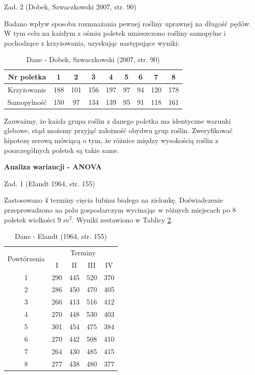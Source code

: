 \documentclass[12pt,B5paper,]{book}
\begin{document}
Zad. 2 (Dobek, Szwaczkowski 2007, str. 90)

Badano wpływ sposobu rozmnażania pewnej rośliny uprawnej na długość
pędów. W tym celu na każdym z ośmiu poletek umieszczono rośliny
samopylne i pochodzące z krzyżowania, uzyskując następujące wyniki:

\begin{table}[H]
\centering
\caption{Dane - Dobek, Szwaczkowski (2007, str. 90)}
\label{Dobek90}
\begin{tabular}{ccccccccc}
\hline
Nr poletka  & 1   & 2   & 3   & 4   & 5  & 6  & 7   & 8   \\ \hline
Krzyżowanie & 188 & 101 & 156 & 197 & 97 & 94 & 120 & 178 \\
Samopylność & 150 & 97  & 134 & 139 & 95 & 91 & 118 & 161 \\ \hline
\end{tabular}
\end{table}

Zauważmy, że każda grupa roślin z danego poletka ma identyczne warunki
glebowe, stąd możemy przyjąć zależność obydwu grup roślin. Zweryfikować
hipotezę zerową mówiącą o tym, że różnice między wysokością roślin z
poszczególnych poletek są takie same.

\vspace{0.8cm}

\textbf{Analiza wariancji - ANOVA}

Zad. 1 (Elandt 1964, str. 155)

Zastosowano 4 terminy cięcia łubinu białego na zielonkę. Doświadczenie
przeprowadzono na polu gospodarczym wycinając w różnych miejscach po 8
poletek wielkości 9 \(m^2\). Wyniki zestawiono w Tablicy
\ref{elandt155}.

\begin{table}[H]
\centering
\caption{Dane - Elandt (1964, str. 155)}
\label{elandt155}
\begin{tabular}{ccccc}
\hline
\multirow{2}{*}{Powtórzenia} & \multicolumn{4}{c}{Terminy}   \\ 
                             & I     & II    & III   & IV    \\ \hline
1                            & 290   & 445   & 520   & 370   \\
2                            & 286   & 450   & 470   & 405   \\
3                            & 266   & 413   & 516   & 412   \\
4                            & 270   & 448   & 530   & 403   \\
5                            & 301   & 454   & 475   & 384   \\
6                            & 270   & 442   & 508   & 410   \\
7                            & 264   & 430   & 485   & 415   \\
8                            & 277   & 438   & 480   & 377   \\  \hline
\end{tabular}
\end{table}
\end{document}
